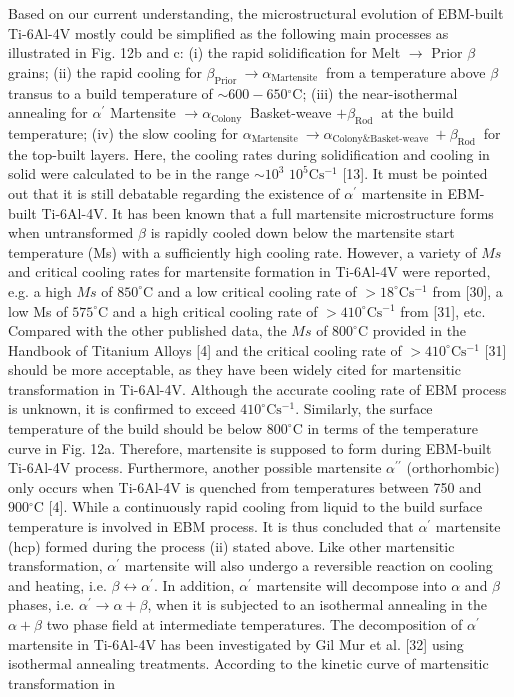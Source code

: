 \documentclass[10pt]{article}
\begin{document}
Based on our current understanding, the microstructural evolution of EBM-built Ti-6Al-4V mostly could be simplified as the following main processes as illustrated in Fig. 12b and c: (i) the rapid solidification for Melt $\rightarrow$ Prior $\beta$ grains; (ii) the rapid cooling for $\beta_{\text {Prior }} \rightarrow \alpha_{\text {Martensite }}$ from a temperature above $\beta$ transus to a build temperature of $\sim 600-650{ }^{\circ} \mathrm{C}$; (iii) the near-isothermal annealing for $\alpha^{\prime}$ Martensite $\rightarrow \alpha_{\text {Colony }}$ Basket-weave $+\beta_{\text {Rod }}$ at the build temperature; (iv) the slow cooling for $\alpha_{\text {Martensite }} \rightarrow \alpha_{\text {Colony\&Basket-weave }}+\beta_{\text {Rod }}$ for the top-built layers. Here, the cooling rates during solidification and cooling in solid were calculated to be in the range $\sim 10^{3}$ $10^{5} \mathrm{C} \mathrm{s}^{-1}$ [13]. It must be pointed out that it is still debatable regarding the existence of $\alpha^{\prime}$ martensite in EBM-built Ti-6Al-4V. It has been known that a full martensite microstructure forms when untransformed $\beta$ is rapidly cooled down below the martensite start temperature (Ms) with a sufficiently high cooling rate. However, a variety of $M s$ and critical cooling rates for martensite formation in Ti-6Al-4V were reported, e.g. a high $M s$ of $850^{\circ} \mathrm{C}$ and a low critical cooling rate of $>18^{\circ} \mathrm{C} \mathrm{s}^{-1}$ from [30], a low Ms of $575^{\circ} \mathrm{C}$ and a high critical cooling rate of $>410^{\circ} \mathrm{C} \mathrm{s}^{-1}$ from [31], etc. Compared with the other published data, the $M s$ of $800^{\circ} \mathrm{C}$ provided in the Handbook of Titanium Alloys [4] and the critical cooling rate of $>410^{\circ} \mathrm{C} \mathrm{s}^{-1}$ [31] should be more acceptable, as they have been widely cited for martensitic transformation in Ti-6Al-4V. Although the accurate cooling rate of EBM process is unknown, it is confirmed to exceed $410^{\circ} \mathrm{C} \mathrm{s}^{-1}$. Similarly, the surface temperature of the build should be below $800^{\circ} \mathrm{C}$ in terms of the temperature curve in Fig. 12a. Therefore, martensite is supposed to form during EBM-built Ti-6Al-4V process. Furthermore, another possible martensite $\alpha^{\prime \prime}$ (orthorhombic) only occurs when Ti-6Al-4V is quenched from temperatures between 750 and $900{ }^{\circ} \mathrm{C}$ [4]. While a continuously rapid cooling from liquid to the build surface temperature is involved in EBM process. It is thus concluded that $\alpha^{\prime}$ martensite (hcp) formed during the process (ii) stated above. Like other martensitic transformation, $\alpha^{\prime}$ martensite will also undergo a reversible reaction on cooling and heating, i.e. $\beta \leftrightarrow \alpha^{\prime}$. In addition, $\alpha^{\prime}$ martensite will decompose into $\alpha$ and $\beta$ phases, i.e. $\alpha^{\prime} \rightarrow \alpha+\beta$, when it is subjected to an isothermal annealing in the $\alpha+\beta$ two phase field at intermediate temperatures. The decomposition of $\alpha^{\prime}$ martensite in Ti-6Al-4V has been investigated by Gil Mur et al. [32] using isothermal annealing treatments. According to the kinetic curve of martensitic transformation in 
\end{document}
